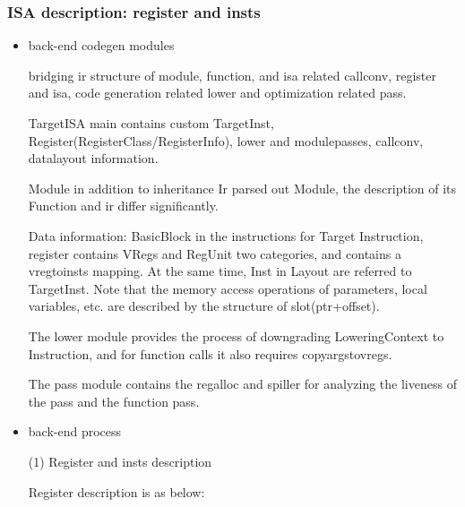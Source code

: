 \subsubsection{ISA description: register and insts}

\begin{itemize}
    \item back-end codegen modules

bridging ir structure of module, function, and isa related callconv, register and isa, code generation related lower and optimization related pass.

TargetISA main contains custom TargetInst, Register(RegisterClass/RegisterInfo), lower and modulepasses, callconv, datalayout information.

Module in addition to inheritance Ir parsed out Module, the description of its Function and ir differ significantly.

Data information: BasicBlock in the instructions for Target Instruction, register contains VRegs and RegUnit two categories, and contains a vregtoinsts mapping.
At the same time, Inst in Layout are referred to TargetInst. Note that the memory access operations of parameters, local variables, etc. are described by the structure of slot(ptr+offset).

The lower module provides the process of downgrading LoweringContext to Instruction, and for function calls it also requires copyargstovregs.

The pass module contains the regalloc and spiller for analyzing the liveness of the pass and the function pass.

        \item back-end process

(1) Register and insts description

Register description is as below:
\begin{table}[!ht]
    \caption{Register Description}
    \label{table:register-description}
\end{table}


\end{itemize}

